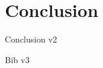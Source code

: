 \documentclass[12pt, a4paper]{article}
\begin{document}
        
        
        
\section{{Conclusion}}
        
        
        {Conclusion v2}        
        



        
\clearpage


{Bib v3}







\end{document}
